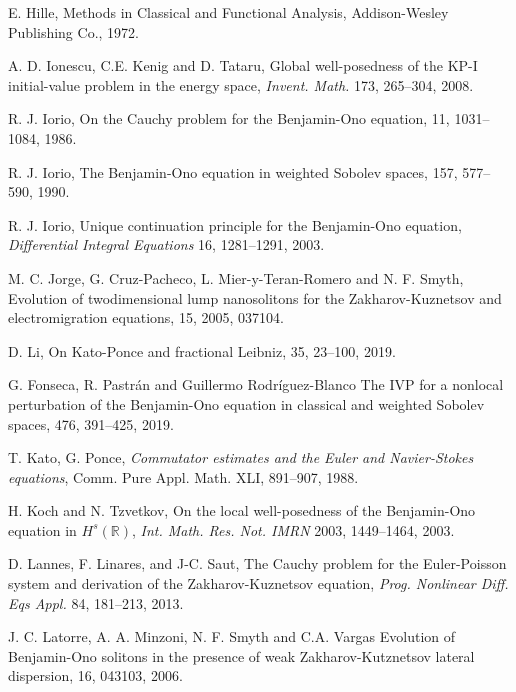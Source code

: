\documentclass[reqno]{amsart}
\newcommand{\R}{\mathbb R}
\numberwithin{equation}{section}
\begin{document}
\begin{thebibliography}{99}
 E. Hille, Methods in Classical and Functional Analysis, Addison-Wesley Publishing
Co., 1972.



 A. D. Ionescu, C.E. Kenig and D. Tataru, Global well-posedness of the KP-I initial-value
problem in the energy space, \textit{Invent. Math.} 173, 265--304, 2008.

R. J. Iorio,
\newblock On the Cauchy problem for the Benjamin-Ono equation,
 11, 1031--1084, 1986.

R. J. Iorio,
\newblock The Benjamin-Ono equation in weighted Sobolev spaces,
 157, 577--590, 1990.

 R. J. Iorio, Unique continuation principle for the Benjamin-Ono equation, \textit{Differential Integral Equations} 16, 1281--1291, 2003.

M. C. Jorge, G. Cruz-Pacheco, L. Mier-y-Teran-Romero and N. F. Smyth,
\newblock Evolution of twodimensional
lump nanosolitons for the Zakharov-Kuznetsov and electromigration equations,
 15, 2005, 037104.

D. Li, On Kato-Ponce and fractional Leibniz, 
 35, 23--100, 2019.


G. Fonseca, R. Pastr\'an and Guillermo Rodr\'iguez-Blanco
\newblock The IVP for a nonlocal perturbation of the Benjamin-Ono equation in classical and weighted Sobolev spaces,
 476, 391--425, 2019.

 T. Kato, G. Ponce, \textit{Commutator estimates and the Euler and Navier-Stokes equations}, Comm. Pure  Appl. Math.  XLI,  891--907, 1988.

 H. Koch and N. Tzvetkov, On the local well-posedness of the Benjamin-Ono
equation in $H^s(\R)$,   {\em Int. Math. Res. Not. IMRN} 2003, 1449--1464,
2003.

    D. Lannes, F.  Linares, and J-C. Saut,   The Cauchy problem for the Euler-Poisson system and derivation of the Zakharov-Kuznetsov equation, \textit{Prog. Nonlinear Diff. Eqs Appl.} 84, 181--213, 2013.


J. C. Latorre, A. A. Minzoni, N. F. Smyth and C.A. Vargas
\newblock Evolution of Benjamin-Ono solitons in
the presence of weak Zakharov-Kutznetsov lateral dispersion,
 16, 043103, 2006.







\end{thebibliography}
\end{document}
